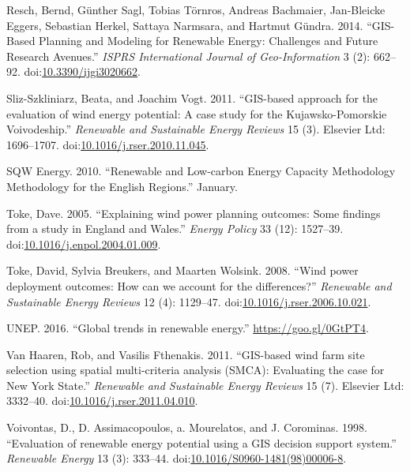 \documentclass[a4paper,]{article}
\theoremstyle{definition}
\theoremstyle{definition}
\theoremstyle{remark}
\begin{document}
{\hypertarget{ref-Resch2014}{}
Resch, Bernd, Günther Sagl, Tobias Törnros, Andreas Bachmaier,
Jan-Bleicke Eggers, Sebastian Herkel, Sattaya Narmsara, and Hartmut
Gündra. 2014. ``GIS-Based Planning and Modeling for Renewable Energy:
Challenges and Future Research Avenues.'' \emph{ISPRS International
Journal of Geo-Information} 3 (2): 662--92.
doi:\href{https://doi.org/10.3390/ijgi3020662}{10.3390/ijgi3020662}.

\hypertarget{ref-Sliz-Szkliniarz2011}{}
Sliz-Szkliniarz, Beata, and Joachim Vogt. 2011. ``GIS-based approach for
the evaluation of wind energy potential: A case study for the
Kujawsko-Pomorskie Voivodeship.'' \emph{Renewable and Sustainable Energy
Reviews} 15 (3). Elsevier Ltd: 1696--1707.
doi:\href{https://doi.org/10.1016/j.rser.2010.11.045}{10.1016/j.rser.2010.11.045}.

\hypertarget{ref-SQWEnergy2010}{}
SQW Energy. 2010. ``Renewable and Low-carbon Energy Capacity Methodology
Methodology for the English Regions.'' January.

\hypertarget{ref-Toke2005}{}
Toke, Dave. 2005. ``Explaining wind power planning outcomes: Some
findings from a study in England and Wales.'' \emph{Energy Policy} 33
(12): 1527--39.
doi:\href{https://doi.org/10.1016/j.enpol.2004.01.009}{10.1016/j.enpol.2004.01.009}.

\hypertarget{ref-Toke2008}{}
Toke, David, Sylvia Breukers, and Maarten Wolsink. 2008. ``Wind power
deployment outcomes: How can we account for the differences?''
\emph{Renewable and Sustainable Energy Reviews} 12 (4): 1129--47.
doi:\href{https://doi.org/10.1016/j.rser.2006.10.021}{10.1016/j.rser.2006.10.021}.

\hypertarget{ref-UNEP2016}{}
UNEP. 2016. ``Global trends in renewable energy.''
\url{https://goo.gl/0GtPT4}.

\hypertarget{ref-VanHaaren2011}{}
Van Haaren, Rob, and Vasilis Fthenakis. 2011. ``GIS-based wind farm site
selection using spatial multi-criteria analysis (SMCA): Evaluating the
case for New York State.'' \emph{Renewable and Sustainable Energy
Reviews} 15 (7). Elsevier Ltd: 3332--40.
doi:\href{https://doi.org/10.1016/j.rser.2011.04.010}{10.1016/j.rser.2011.04.010}.

\hypertarget{ref-Voivontas1998}{}
Voivontas, D., D. Assimacopoulos, a. Mourelatos, and J. Corominas. 1998.
``Evaluation of renewable energy potential using a GIS decision support
system.'' \emph{Renewable Energy} 13 (3): 333--44.
doi:\href{https://doi.org/10.1016/S0960-1481(98)00006-8}{10.1016/S0960-1481(98)00006-8}.

}
\end{document}
